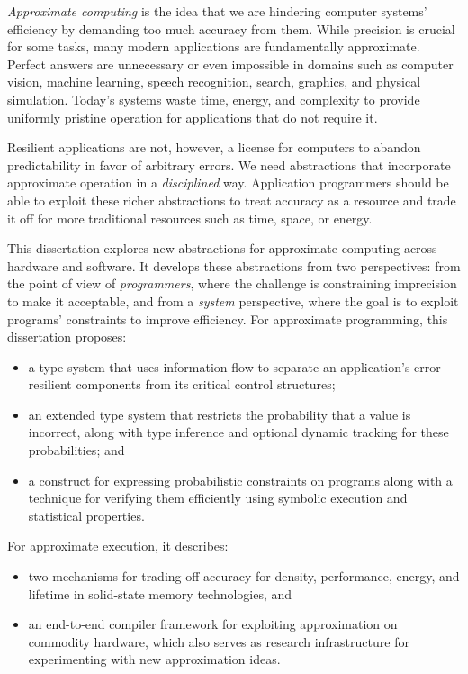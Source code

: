 \emph{Approximate computing} is the idea that we are hindering computer
systems' efficiency by demanding too much accuracy from them.
While precision is crucial for some tasks, many
modern applications are fundamentally approximate.
Perfect answers are unnecessary or even impossible in domains such as
computer vision, machine learning,
speech recognition, search, graphics, and physical simulation.
Today's systems waste time, energy, and complexity to provide uniformly
pristine operation for applications that do not require it.

Resilient applications are not, however, a license for computers to abandon
predictability in favor of arbitrary errors.
We need abstractions that incorporate approximate operation in a
\emph{disciplined} way.
Application programmers should be able to exploit these richer abstractions to
treat accuracy as a resource and trade it off for more traditional
resources such as time, space, or energy.

This dissertation explores new abstractions for approximate computing across
hardware and software.
It develops these abstractions from two perspectives:
from the point of view of \emph{programmers}, where the challenge is
constraining imprecision to make it acceptable,
and from a \emph{system} perspective, where the goal is to exploit programs'
constraints to improve efficiency.
For approximate programming, this dissertation proposes:
%
\begin{itemize}
\item
a type system that uses information flow to separate an
application's error-resilient components from its critical control structures;
\item
an extended type system that restricts the probability that a value
is incorrect, along with type inference and optional dynamic tracking for
these probabilities; and
\item
a construct for expressing probabilistic constraints on programs along with a
technique for verifying them efficiently using symbolic execution and
statistical properties.
\end{itemize}
%
For approximate execution, it describes:
%
\begin{itemize}
\item
two mechanisms for trading off accuracy for density, performance, energy, and
lifetime in solid-state memory technologies, and
\item
an end-to-end compiler framework for exploiting approximation on
commodity hardware, which also serves as research infrastructure for
experimenting with new approximation ideas.
\end{itemize}
